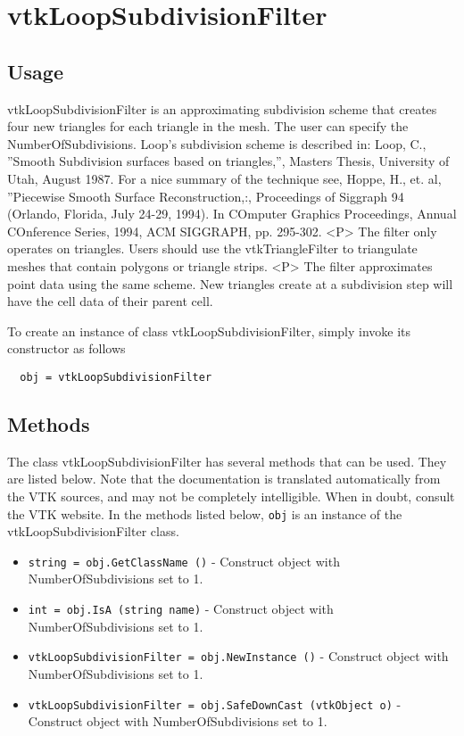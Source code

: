 \section{vtkLoopSubdivisionFilter}

\subsection{Usage}

 vtkLoopSubdivisionFilter is an approximating subdivision scheme that
 creates four new triangles for each triangle in the mesh. The user can
 specify the NumberOfSubdivisions. Loop's subdivision scheme is
 described in: Loop, C., ''Smooth Subdivision surfaces based on
 triangles,'', Masters Thesis, University of Utah, August 1987.
 For a nice summary of the technique see, Hoppe, H., et. al,
 ''Piecewise Smooth Surface Reconstruction,:, Proceedings of Siggraph 94
 (Orlando, Florida, July 24-29, 1994). In COmputer Graphics
 Proceedings, Annual COnference Series, 1994, ACM SIGGRAPH,
 pp. 295-302.
 <P>
 The filter only operates on triangles. Users should use the
 vtkTriangleFilter to triangulate meshes that contain polygons or
 triangle strips.
 <P>
 The filter approximates point data using the same scheme. New
 triangles create at a subdivision step will have the cell data of
 their parent cell.

To create an instance of class vtkLoopSubdivisionFilter, simply
invoke its constructor as follows
\begin{verbatim}
  obj = vtkLoopSubdivisionFilter
\end{verbatim}
\subsection{Methods}

The class vtkLoopSubdivisionFilter has several methods that can be used.
  They are listed below.
Note that the documentation is translated automatically from the VTK sources,
and may not be completely intelligible.  When in doubt, consult the VTK website.
In the methods listed below, \verb|obj| is an instance of the vtkLoopSubdivisionFilter class.
\begin{itemize}
\item  \verb|string = obj.GetClassName ()| -  Construct object with NumberOfSubdivisions set to 1.

\item  \verb|int = obj.IsA (string name)| -  Construct object with NumberOfSubdivisions set to 1.

\item  \verb|vtkLoopSubdivisionFilter = obj.NewInstance ()| -  Construct object with NumberOfSubdivisions set to 1.

\item  \verb|vtkLoopSubdivisionFilter = obj.SafeDownCast (vtkObject o)| -  Construct object with NumberOfSubdivisions set to 1.

\end{itemize}
